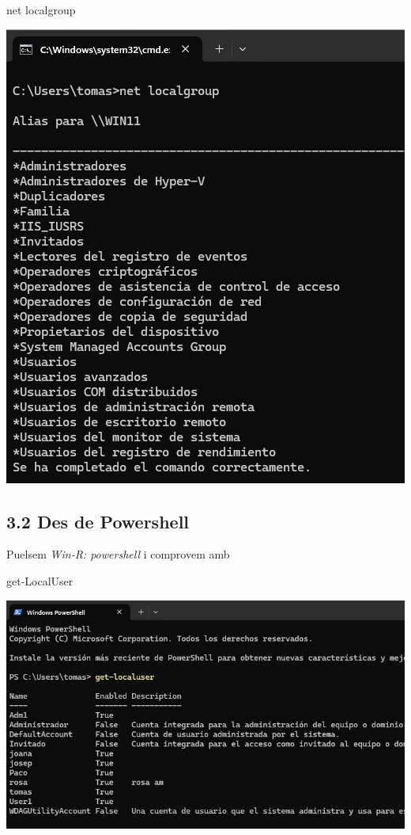\documentclass[
  a4paper,
]{article}
\newenvironment{Shaded}{\begin{snugshade}}{\end{snugshade}}
\newcommand{\NormalTok}[1]{#1}
\begin{document}
\begin{Shaded}
\begin{Highlighting}[]
\NormalTok{net localgroup}
\end{Highlighting}
\end{Shaded}

\includegraphics{png/netLocalGroup.png}

\subsection{3.2 Des de Powershell}\label{des-de-powershell}

Puelsem \emph{Win-R: powershell} i comprovem amb

\begin{Shaded}
\begin{Highlighting}[]
\NormalTok{get{-}LocalUser}
\end{Highlighting}
\end{Shaded}

\includegraphics{png/get-LocalUser.png}
\end{document}
